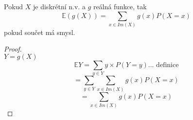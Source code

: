 \documentclass[../main.tex]{subfiles}
\begin{document}
\begin{theorem}[LOTUS]
    Pokud $X$ je diskrétní n.v. a $g$ reálná funkce, tak 
    \[\mathbb{E}(g(X)) = \sum_{x\in Im(X)}g(x)P(X=x)\]
    pokud součet má smysl.
\end{theorem}
\begin{proof}\\
    $Y = g(X)$
    \[\mathbb{E}Y = \sum_{y\in Y} y\times P(Y=y) \text{... definice}\]
    \[= \sum_{y \in Y} \sum_{x\in Im(X)}g(x) P(X=x)\]
    \[= \sum_{x\in Im(X)} g(x) P(X=x)\]
\end{proof}
\end{document}
